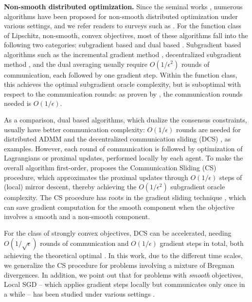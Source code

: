 \documentclass[10pt]{article}
\begin{document}
 



\textbf{Non-smooth distributed optimization.} Since the seminal works \cite{BertsekasTsitsiklis1989,TsitsiklisBertsekasAthans1986}, numerous algorithms have been proposed for non-smooth distributed optimization under various settings, and we refer readers to surveys such as \cite{AssranAytekinFeyzmahdavianJohanssonRabbat2020,NedicOlshevskyRabbat2018,konecny2016federatedoptimizationdistributedmachine}. For the function class of Lipschitz, non-smooth, convex objectives, most of these algorithms fall into the following two categories: subgradient based and dual based \cite{lan_communication-efficient_2020}. Subgradient based algorithms such as the incremental gradient method \cite{bertsekas_incremental_2011}, decentralized subgradient method \cite{NedicOzdaglar2009}, and the dual averaging \cite{Duchi2012DA} usually require $O(1/\epsilon^2)$ rounds of communication, each followed by one gradient step. Within the function class, this achieves the optimal subgradient oracle complexity, but is suboptimal with respect to the communication rounds: as proven by \cite{ArjevaniShamir2015Communication,Scaman2019}, the communication rounds needed is $O(1/\epsilon)$. 

As a comparison, dual based algorithms, which dualize the consensus constraints, usually have better communication complexity: $O(1/\epsilon)$ rounds are needed for distributed ADMM \cite{Aybat2018,wei2013o1kconvergenceasynchronousdistributed} and the decentralized communication sliding (DCS) \cite{lan_communication-efficient_2020}, as examples. However, each round of communication is followed by optimization of Lagrangians or proximal updates, performed locally by each agent. To make the overall algorithm first-order, \cite{lan_communication-efficient_2020} proposes the Communication Sliding (CS) procedure, which approximates the proximal updates through $O(1/\epsilon)$ steps of (local) mirror descent, thereby achieving the $O(1/\epsilon^2)$ subgradient oracle complexity. The CS procedure has roots in  the gradient sliding technique \cite{lan_gradient_2016}, which can save gradient computation for the smooth component when the objective involves a smooth and a non-smooth component. 


For the class of strongly convex objectives, DCS can be accelerated, needing $O(1/\sqrt{\epsilon})$ rounds of communication and $O(1/\epsilon)$ gradient steps in total, both achieving the theoretical optimal \cite{lan_communication-efficient_2020}. In this work, due to the different time scales, we generalize the CS procedure for problems involving a mixture of Bregman divergences. In addition, we point out that for problems with \textit{smooth} objectives, Local SGD -- which applies gradient steps locally but communicates only once in a while -- has been studied under various settings \cite{Zinkevich2010,stich2019local,Woodworth2020}. 
\end{document}
